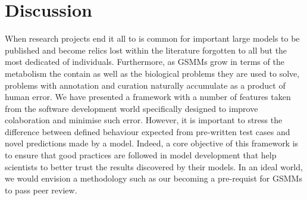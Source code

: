 \documentclass{bioinfo}
\begin{document}
% 
% 
% 
% 
% 
% 
\section{Discussion}
When research projects end it all to is common for important large models to be published and become relics lost within the literature forgotten to all but the most dedicated of individuals.
Furthermore, as GSMMs grow in terms of the metabolism the contain as well as the biological problems they are used to solve, problems with annotation and curation naturally accumulate as a product of human error.
We have presented a framework with a number of features taken from the software development world specifically designed to improve colaboration and minimise such error.
However, it is important to stress the difference between defined behaviour expected from pre-written test cases and novel predictions made by a model.
Indeed, a core objective of this framework is to ensure that good practices are followed in model development that help scientists to better trust the results discovered by their models.
In an ideal world, we would envision a methodology such as our becoming a pre-requist for GSMMs to pass peer review. 
\end{document}
